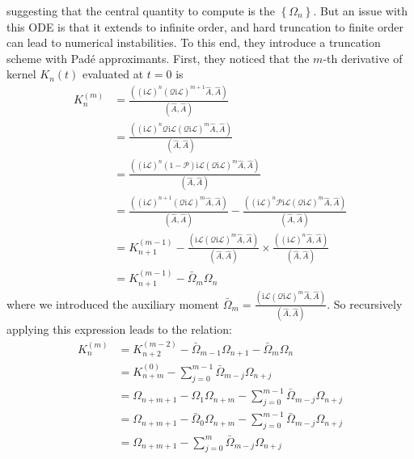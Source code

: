 suggesting that the central quantity to compute is the $\left\{\Omega_n\right\}$. But an issue with this ODE is that it extends to infinite order, and hard truncation to finite order can lead to numerical instabilities. To this end, they introduce a truncation scheme with Padé approximants. First, they noticed that the $m$-th derivative of kernel $K_n(t)$ evaluated at $t=0$ is
\begin{align}
K_n^{(m)} &= \frac{\left((\mathrm{i} \mathcal{L})^n(\mathcal{Q} \mathrm{i} \mathcal{L})^{m+1} \hat{A}, \hat{A}\right)}{(\hat{A}, \hat{A})} \\
&= \frac{\left((\mathrm{i} \mathcal{L})^n \mathcal{Q} \mathrm{i} \mathcal{L} (\mathcal{Q} \mathrm{i} \mathcal{L})^{m}\hat{A}, \hat{A}\right)}{(\hat{A}, \hat{A})} \\
&= \frac{\left((\mathrm{i} \mathcal{L})^n \left(1-\mathcal{P}\right) \mathrm{i} \mathcal{L} (\mathcal{Q} \mathrm{i} \mathcal{L})^{m} \hat{A}, \hat{A}\right)}{(\hat{A}, \hat{A})} \\
&= \frac{\left((\mathrm{i} \mathcal{L})^{n+1} (\mathcal{Q} \mathrm{i} \mathcal{L})^{m} \hat{A}, \hat{A}\right)}{(\hat{A}, \hat{A})} - \frac{\left((\mathrm{i} \mathcal{L})^n \mathcal{P} \mathrm{i} \mathcal{L} (\mathcal{Q} \mathrm{i} \mathcal{L})^{m} \hat{A}, \hat{A}\right)}{(\hat{A}, \hat{A})} \\
&= K_{n+1}^{(m-1)} - \frac{\left(\mathrm{i} \mathcal{L}(\mathcal{Q} \mathrm{i} \mathcal{L})^m \hat{A}, \hat{A}\right)}{(\hat{A}, \hat{A})} \times \frac{\left((\mathrm{i} \mathcal{L})^n \hat{A}, \hat{A}\right)}{(\hat{A}, \hat{A})} \\
&= K_{n+1}^{(m-1)} - \bar{\Omega}_m \Omega_n 
\end{align}
where we introduced the auxiliary moment $\bar{\Omega}_m=\frac{\left(\mathrm{i} \mathcal{L}(\mathcal{Q} \mathrm{i} \mathcal{L})^m \hat{A}, \hat{A}\right)}{(\hat{A}, \hat{A})}$.
So recursively applying this expression leads to the relation: 
\begin{align}
K_n^{(m)} &= K_{n+2}^{(m-2)} - \bar{\Omega}_{m-1} \Omega_{n+1} - \bar{\Omega}_m \Omega_{n} \\
&= K_{n+m}^{(0)} - \sum_{j=0}^{m-1} \bar{\Omega}_{m-j} \Omega_{n+j} \\
&= \Omega_{n+m+1} - \Omega_{1} \Omega_{n+m} - \sum_{j=0}^{m-1} \bar{\Omega}_{m-j} \Omega_{n+j} \\
&= \Omega_{n+m+1} - \bar{\Omega}_{0} \Omega_{n+m} - \sum_{j=0}^{m-1} \bar{\Omega}_{m-j} \Omega_{n+j} \\
&= \Omega_{n+m+1} - \sum_{j=0}^{m} \bar{\Omega}_{m-j} \Omega_{n+j} \\
\end{align}
